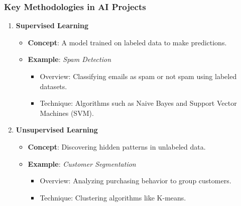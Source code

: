 \documentclass{beamer}
\begin{document}
\begin{frame}[fragile]
    \frametitle{Key Methodologies in AI Projects}
    \begin{enumerate}
        \item \textbf{Supervised Learning}
            \begin{itemize}
                \item \textbf{Concept}: A model trained on labeled data to make predictions.
                \item \textbf{Example}: \textit{Spam Detection}
                    \begin{itemize}
                        \item Overview: Classifying emails as spam or not spam using labeled datasets.
                        \item Technique: Algorithms such as Naive Bayes and Support Vector Machines (SVM).
                    \end{itemize}
            \end{itemize}
        \item \textbf{Unsupervised Learning}
            \begin{itemize}
                \item \textbf{Concept}: Discovering hidden patterns in unlabeled data.
                \item \textbf{Example}: \textit{Customer Segmentation}
                    \begin{itemize}
                        \item Overview: Analyzing purchasing behavior to group customers.
                        \item Technique: Clustering algorithms like K-means.
                    \end{itemize}
            \end{itemize}
    \end{enumerate}
\end{frame}
\end{document}
